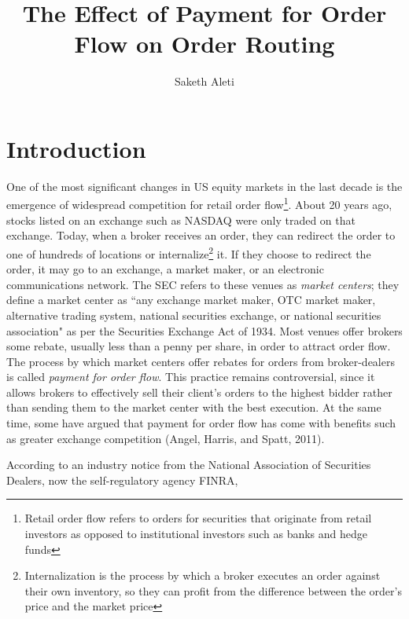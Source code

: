 \documentclass[11pt,a4paper]{article}
\begin{document}
	
\title{The Effect of Payment for Order Flow on Order Routing}

\author{Saketh Aleti}

\maketitle


\section{Introduction}	

One of the most significant changes in US equity markets in the last decade is the emergence of widespread competition for retail order flow\footnote{ Retail order flow refers to orders for securities that originate from retail investors as opposed to institutional investors such as banks and hedge funds}. About 20 years ago, stocks listed on an exchange such as NASDAQ were only traded on that exchange. Today, when a broker receives an order, they can redirect the order to one of hundreds of locations or internalize\footnote{ Internalization is the process by which a broker executes an order against their own inventory, so they can profit from the difference between the order's price and the market price} it. If they choose to redirect the order, it may go to an exchange, a market maker, or an electronic communications network. 
The SEC refers to these venues as \textit{market centers}; they define a market center as ``any exchange market maker, OTC market maker, alternative trading system, national securities exchange, or national securities association" as per the Securities Exchange Act of 1934.
Most venues offer brokers some rebate, usually less than a penny per share, in order to attract order flow.  The process by which market centers offer rebates for orders from broker-dealers is called \textit{payment for order flow}. This practice remains controversial, since it allows brokers to effectively sell their client's orders to the highest bidder rather than sending them to the market center with the best execution. At the same time, some have argued that payment for order flow has come with benefits such as greater exchange competition (Angel, Harris, and Spatt, 2011). 


According to an industry notice from the National Association of Securities Dealers, now the self-regulatory agency FINRA,
\end{document}
